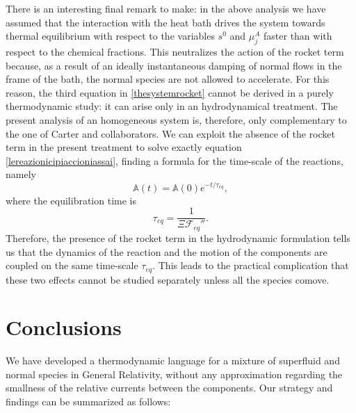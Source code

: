 \documentclass[usenatbib]{mnras}
\begin{document}
There is an interesting final remark to make: in the above analysis we have assumed that the interaction with the heat bath drives the system towards thermal equilibrium with respect to the variables $s^0$ and $\mu^A_j$ faster than with respect to the chemical fractions. This neutralizes the action of the rocket term because, as a result of an ideally instantaneous damping of normal flows in the frame of the bath, the normal species are not allowed to accelerate. For this reason, the third equation in \eqref{thesystemrocket} cannot be derived in a purely thermodynamic study: it can arise only in an hydrodynamical treatment. 
The present analysis of an homogeneous system is, therefore, only complementary to the one of Carter and collaborators. We can exploit the absence of the rocket term in the present treatment to solve exactly equation \eqref{lereazionicipiaccioniassai}, finding a formula for the time-scale of the reactions, namely
%
\begin{equation}
\mathbb{A}(t)=\mathbb{A}(0) e^{-t/\tau_{eq}},
\end{equation}
%
where the equilibration time is
%
\begin{equation}
\tau_{eq} = \dfrac{1}{\Xi \mathcal{F}_{eq}''}.
\end{equation}
%
Therefore, the presence of the rocket term in the hydrodynamic formulation tells us that the dynamics of the reaction and the motion of the components are coupled on the same time-scale $\tau_{eq}$. This leads to the practical complication that these two effects cannot be studied separately unless all the species comove.
%



\section{Conclusions}
\label{sec:conclusions}

We have developed a thermodynamic language for a  mixture of superfluid and normal species 
in General Relativity, without any approximation regarding the smallness of the relative currents between the components.
Our strategy and findings can be summarized as follows:
\end{document}
